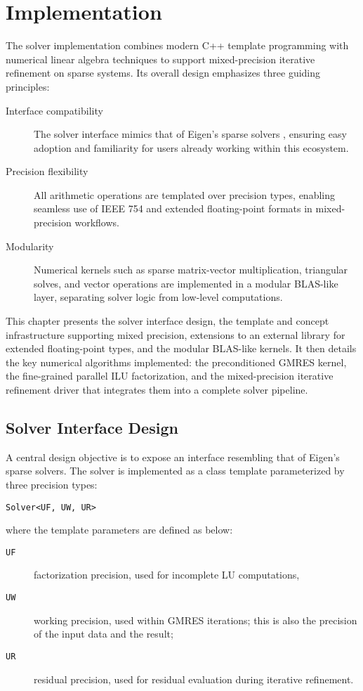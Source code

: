 \chapter{Implementation}
\label{cha:implementation}

The solver implementation combines modern C++ template programming with
numerical linear algebra techniques to support mixed-precision iterative
refinement on sparse systems. Its overall design emphasizes three guiding
principles:

\begin{description}
\item[Interface compatibility] The solver interface mimics that of Eigen’s sparse
  solvers \cite{noauthor_eigen_nodate}, ensuring easy adoption and familiarity
  for users already working within this ecosystem.
\item[Precision flexibility] All arithmetic operations are templated over precision
  types, enabling seamless use of IEEE 754 and extended floating-point formats
  in mixed-precision workflows.
\item[Modularity] Numerical kernels such as sparse matrix-vector multiplication,
  triangular solves, and vector operations are implemented in a modular
  BLAS-like layer, separating solver logic from low-level computations.
\end{description}

This chapter presents the solver interface design, the template and concept
infrastructure supporting mixed precision, extensions to an external library for
extended floating-point types, and the modular BLAS-like kernels. It then
details the key numerical algorithms implemented: the preconditioned GMRES
kernel, the fine-grained parallel ILU factorization, and the mixed-precision
iterative refinement driver that integrates them into a complete solver
pipeline.

\section{Solver Interface Design}
\label{sec:solv-inetrf-design}

A central design objective is to expose an interface resembling that of Eigen's
sparse solvers. The solver is implemented as a class template parameterized by
three precision types:
\begin{center}
  \texttt{Solver<UF, UW, UR>}
\end{center}
where the template parameters are defined as below:
\begin{description}
\item[\texttt{UF}] factorization precision, used for incomplete LU computations,
\item[\texttt{UW}] working precision, used within GMRES iterations; this is also the
  precision of the input data and the result;
\item[\texttt{UR}] residual precision, used for residual evaluation during iterative
  refinement.
\end{description}

